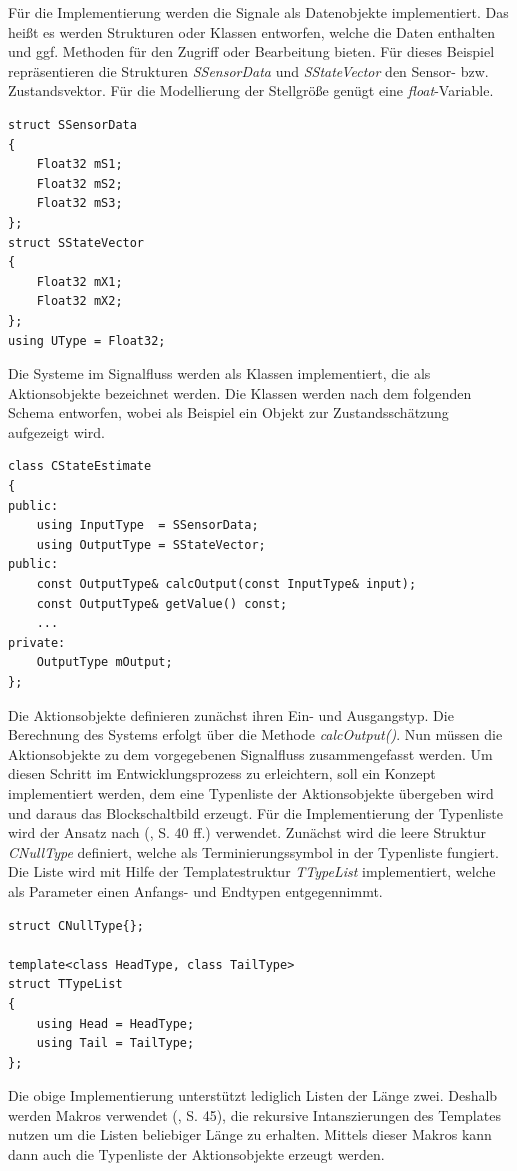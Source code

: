 Für die Implementierung werden die Signale als Datenobjekte implementiert. Das heißt es werden Strukturen oder Klassen entworfen, welche die Daten enthalten und ggf. Methoden für den Zugriff oder Bearbeitung bieten. Für dieses Beispiel repräsentieren die Strukturen \textit{SSensorData} und \textit{SStateVector} den Sensor- bzw. Zustandsvektor. Für die Modellierung der Stellgröße genügt eine \textit{float}-Variable.
\begin{lstlisting}[caption={Beispielhafte Implementierung eines Datenobjektes},captionpos=b]
struct SSensorData
{
	Float32 mS1;
	Float32 mS2;
	Float32 mS3;
};
struct SStateVector
{
	Float32 mX1;
	Float32 mX2;
};
using UType = Float32;
\end{lstlisting}
Die Systeme im Signalfluss werden als Klassen implementiert, die als Aktionsobjekte bezeichnet werden. Die Klassen werden nach dem folgenden Schema entworfen, wobei als Beispiel ein Objekt zur Zustandsschätzung aufgezeigt wird.
\begin{lstlisting}[caption={Beispielhafte Implementierung eines Aktionsobjektes},captionpos=b]
class CStateEstimate
{
public:
	using InputType	 = SSensorData;
	using OutputType = SStateVector;
public:
	const OutputType& calcOutput(const InputType& input);
	const OutputType& getValue() const;
	...
private:	 
	OutputType mOutput;
};
\end{lstlisting}
Die Aktionsobjekte definieren zunächst ihren Ein- und Ausgangstyp. Die Berechnung des Systems erfolgt über die Methode \textit{calcOutput()}.
Nun müssen die Aktionsobjekte zu dem vorgegebenen Signalfluss zusammengefasst werden. Um diesen Schritt im Entwicklungsprozess zu erleichtern, soll ein Konzept implementiert werden, dem eine Typenliste der Aktionsobjekte übergeben wird und daraus das Blockschaltbild erzeugt.
Für die Implementierung der Typenliste wird der Ansatz nach (\cite{ModernCpp}, S. 40 ff.) verwendet. Zunächst wird die leere Struktur \textit{CNullType} definiert, welche als Terminierungssymbol in der Typenliste fungiert. Die Liste wird mit Hilfe der Templatestruktur \textit{TTypeList} implementiert, welche als Parameter einen Anfangs- und Endtypen entgegennimmt.
\begin{lstlisting}[caption={Implementierung der Typenlist},captionpos=b]
struct CNullType{};

template<class HeadType, class TailType>
struct TTypeList
{
	using Head = HeadType;
	using Tail = TailType;
};
\end{lstlisting}
Die obige Implementierung unterstützt lediglich Listen der Länge zwei. Deshalb werden Makros verwendet (\cite{ModernCpp}, S. 45), die rekursive Intanszierungen des Templates nutzen um die Listen beliebiger Länge zu erhalten. Mittels dieser Makros kann dann auch die Typenliste der Aktionsobjekte erzeugt werden.
